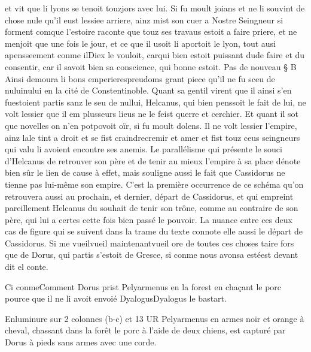 \documentclass{article}
\begin{document}
\begin{pages}
   et vit que li lyons se tenoit touzjors avec lui. 
   Si fu moult joians et ne li souvint de chose nule qu’il eust lessiee arriere, ainz mist son cuer a Nostre Seingneur 
   si forment comque l’estoire raconte 
   que touz ses travaus estoit a faire priere, 
   et ne menjoit que une fois le jour, et ce que il usoit li aportoit le lyon, 
   tout ausi apensseement conme ilDiex le vouloit, 
   carqui bien estoit puissant 
   dude faire et du consentir, 
   car il savoit bien sa conscience, qui bonne estoit. \pend
\pstart Pas de nouveau § B
   Ainsi demoura li bons 
   emperierespreudoms 
   grant piece qu’il ne fu sceu de nuluinului en la cité de Constentinoble. 
   Quant sa gentil virent que il ainsi s’en 
   fuestoient partis sanz le seu de nullui, 
   Helcanus, qui bien penssoit le fait de lui, ne volt lessier que il em plusseurs lieus 
   ne le feist querre et cerchier. Et quant il sot que novelles on n’en 
   potpovoit oïr, si fu moult dolens. 
   Il ne volt lessier l’empire, ainz lale tint a droit 
   et se fist craindrecremir et amer 
   et fist touz ceus seingneurs qui valu li avoient encontre ses anemis. Le parallélisme qui présente
   le souci d'Helcanus de retrouver son père et de tenir au mieux l'empire à sa place dénote bien sûr le lien de cause à effet, 
   mais souligne aussi le fait que Cassidorus ne tienne pas lui-même son empire. C'est la première occurrence de ce schéma qu'on retrouvera
   aussi au prochain, et dernier, départ de Cassidorus, et qui empreint pareillement Helcanus du souhait de tenir son trône, 
   comme au contraire de son père, qui lui a certes cette fois bien passé le pouvoir. La nuance entre ces deux cas de figure qui se 
   suivent dans la trame du texte connote elle aussi le départ de Cassidorus.
   Si me vueilvueil maintenantvueil ore 
      de toutes ces choses taire fors que de Dorus, 
      qui partis s'estoit 
      de Gresce, si conme 
      nous avonsa estéest 
      devant dit el conte.
         \pend
         
            Ci conmeComment 
               Dorus prist 
               Pelyarmenus en la forest en chaçant 
                  le porc 
               pource que il ne li avoit envoié 
               DyalogusDyalogus le bastart.
            
            
               Enluminure sur 2 colonnes (b-c) et 13 UR
                  Pelyarmenus en armes noir et orange à cheval, 
                  chassant dans la forêt le porc à l’aide de deux chiens, 
                  est capturé par Dorus à pieds sans armes avec une corde.
               

\end{pages}
\end{document}
